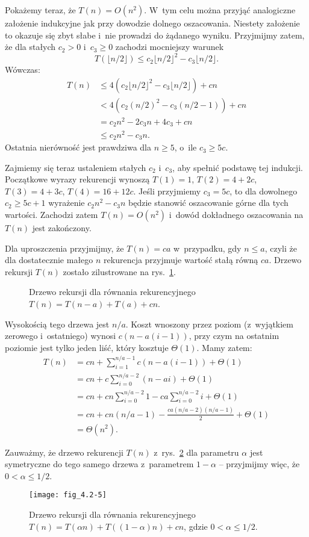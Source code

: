 Pokażemy teraz, że $T(n)=O(n^2)$.
W~tym celu można przyjąć analogiczne założenie indukcyjne jak przy dowodzie dolnego oszacowania.
Niestety założenie to okazuje się zbyt słabe i~nie prowadzi do żądanego wyniku.
Przyjmijmy zatem, że dla stałych $c_2>0$ i~$c_3\ge0$ zachodzi mocniejszy warunek
\[
	T(\lfloor n/2\rfloor) \le c_2\lfloor n/2\rfloor^2-c_3\lfloor n/2\rfloor.
\]
Wówczas:
\begin{align*}
	T(n) &\le 4(c_2\lfloor n/2\rfloor^2-c_3\lfloor n/2\rfloor)+cn \\
	&< 4(c_2(n/2)^2-c_3(n/2-1))+cn \\
	&= c_2n^2-2c_3n+4c_3+cn \\
	&\le c_2n^2-c_3n.
\end{align*}
Ostatnia nierówność jest prawdziwa dla $n\ge5$, o~ile $c_3\ge5c$.

Zajmiemy się teraz ustaleniem stałych $c_2$ i~$c_3$, aby spełnić podstawę tej indukcji.
Początkowe wyrazy rekurencji wynoszą $T(1)=1$, $T(2)=4+2c$, $T(3)=4+3c$, $T(4)=16+12c$.
Jeśli przyjmiemy $c_3=5c$, to dla dowolnego $c_2\ge5c+1$ wyrażenie $c_2n^2-c_3n$ będzie stanowić oszacowanie górne dla tych wartości.
Zachodzi zatem $T(n)=O(n^2)$ i~dowód dokładnego oszacowania na $T(n)$ jest zakończony.

\exercise %
Dla uproszczenia przyjmijmy, że $T(n)=ca$ w~przypadku, gdy $n\le a$, czyli że dla dostatecznie małego $n$ rekurencja przyjmuje wartość stałą równą $ca$.
Drzewo rekursji $T(n)$ zostało zilustrowane na rys.\ \ref{fig:4.2-4}.
\begin{figure}[ht]
	\centering 
	\caption{Drzewo rekursji dla równania rekurencyjnego $T(n)=T(n-a)+T(a)+cn$.} \label{fig:4.2-4}
\end{figure}
Wysokością tego drzewa jest $n/a$.
Koszt wnoszony przez  poziom (z~wyjątkiem zerowego i~ostatniego) wynosi $c(n-a(i-1))$, przy czym na ostatnim poziomie jest tylko jeden liść, który kosztuje $\Theta(1)$.
Mamy zatem:
\begin{align*}
	T(n) &= cn+\sum_{i=1}^{n/a-1}c(n-a(i-1))+\Theta(1) \\
	&= cn+c\sum_{i=0}^{n/a-2}(n-ai)+\Theta(1) \\
	&= cn+cn\sum_{i=0}^{n/a-2}1-ca\sum_{i=0}^{n/a-2}i+\Theta(1) \\
	&= cn+cn(n/a-1)-\frac{ca(n/a-2)(n/a-1)}{2}+\Theta(1) \\
	&= \Theta(n^2).
\end{align*}

\exercise %
Zauważmy, że drzewo rekurencji $T(n)$ z~rys.\ \ref{fig:4.2-5} dla parametru $\alpha$ jest symetryczne do tego samego drzewa z~parametrem $1-\alpha$ -- przyjmijmy więc, że $0<\alpha\le1/2$.
\begin{figure}[ht]
	\centering \texttt{[image: fig\_4.2-5]}
	\caption{Drzewo rekursji dla równania rekurencyjnego $T(n)=T(\alpha n)+T((1-\alpha)n)+cn$, gdzie $0<\alpha\le1/2$.} \label{fig:4.2-5}
\end{figure}


